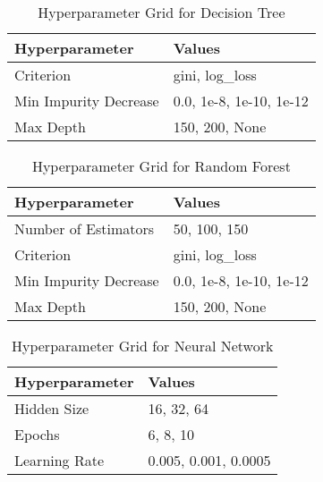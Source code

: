 \begin{table}[H]
    \centering
    \caption{Hyperparameter Grid for Decision Tree}
    \begin{tabular}{l l}
        \toprule
        \textbf{Hyperparameter} & \textbf{Values} \\
        \midrule
        Criterion & gini, log\_loss \\
        Min Impurity Decrease & 0.0, 1e-8, 1e-10, 1e-12 \\
        Max Depth & 150, 200, None \\
        \bottomrule
    \end{tabular}
    \label{tab:dt_search_space}
\end{table}

\begin{table}[H]
    \centering
    \caption{Hyperparameter Grid for Random Forest}
    \begin{tabular}{l l}
        \toprule
        \textbf{Hyperparameter} & \textbf{Values} \\
        \midrule
        Number of Estimators & 50, 100, 150 \\
        Criterion & gini, log\_loss \\
        Min Impurity Decrease & 0.0, 1e-8, 1e-10, 1e-12 \\
        Max Depth & 150, 200, None \\
        \bottomrule
    \end{tabular}
    \label{tab:rf_search_space}
\end{table}

\begin{table}[H]
    \centering
    \caption{Hyperparameter Grid for Neural Network}
    \begin{tabular}{l l}
        \toprule
        \textbf{Hyperparameter} & \textbf{Values} \\
        \midrule
        Hidden Size & 16, 32, 64 \\
        Epochs & 6, 8, 10 \\
        Learning Rate & 0.005, 0.001, 0.0005 \\
        \bottomrule
    \end{tabular}
    \label{tab:nn_search_space}
\end{table}